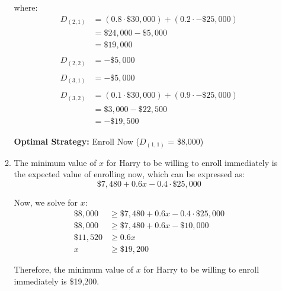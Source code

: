 \documentclass{article}
\begin{document}
\begin{enumerate}
\begin{enumerate}
        where:
        \begin{equation}
            \begin{split}
                D_{(2,1)} &= (0.8 \cdot \$30{,}000) + (0.2 \cdot -\$25{,}000)\\
                &= \$24{,}000 - \$5{,}000\\
                &= \$19{,}000\\~\\
                D_{(2,2)} &= -\$5{,}000\\~\\
                D_{(3,1)} &= -\$5{,}000\\~\\
                D_{(3,2)} &= (0.1 \cdot \$30{,}000) + (0.9 \cdot -\$25{,}000)\\
                &= \$3{,}000 - \$22{,}500\\
                &= -\$19{,}500
            \end{split}
        \end{equation}
        
        \textbf{Optimal Strategy:} Enroll Now ($D_{(1,1)}$ = \$8,000)\\
            
        \item The minimum value of $x$ for Harry to be willing to enroll immediately is the expected value of enrolling now, which can be expressed as:\\

        \begin{equation}
            \$7{,}480 + 0.6x - 0.4 \cdot \$25,000
        \end{equation}

        Now, we solve for $x$:
        \begin{equation}
            \begin{split}
                \$8{,}000 &\geq \$7{,}480 + 0.6x - 0.4 \cdot \$25{,}000\\
                \$8{,}000 &\geq \$7{,}480 + 0.6x - \$10{,}000\\
                \$11{,}520 &\geq 0.6x\\
                x &\geq \$19{,}200
            \end{split}
        \end{equation}
            
        Therefore, the minimum value of $x$ for Harry to be willing to enroll immediately is \$19,200.
    \end{enumerate}

\end{enumerate}
\end{document}
